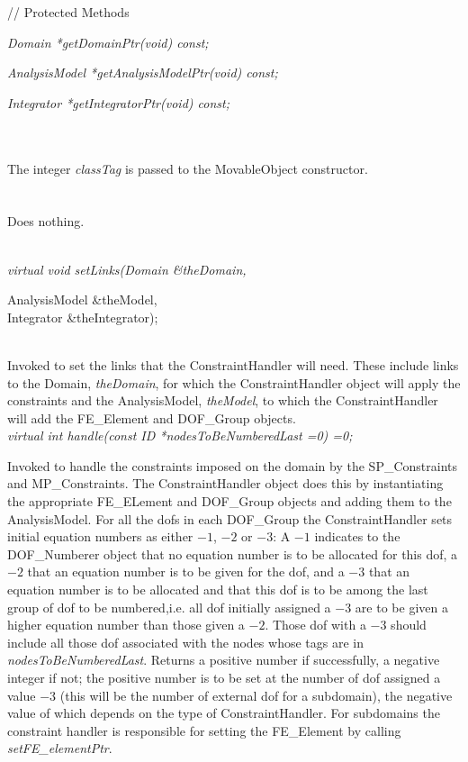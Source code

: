 // Protected Methods  

{\em Domain *getDomainPtr(void) const;} 

{\em AnalysisModel *getAnalysisModelPtr(void) const;} 

{\em Integrator *getIntegratorPtr(void) const;} 



 \\
\\ 
The integer {\em classTag} is passed to the MovableObject constructor. \\

 \\
\\ 
Does nothing. \\

\\
{\em virtual void setLinks(Domain \&theDomain, 

\indent\indent\indent\indent\indent AnalysisModel \&theModel, \\
\indent\indent\indent\indent\indent Integrator \&theIntegrator);} \\
Invoked to set the links that the ConstraintHandler will need. These
include links to the Domain, {\em theDomain}, for which the
ConstraintHandler object will apply the constraints and the
AnalysisModel, {\em theModel}, to which the ConstraintHandler will add
the FE\_Element and DOF\_Group objects. \\

{\em virtual int handle(const ID *nodesToBeNumberedLast =0) =0;} 

Invoked to handle the constraints imposed on the domain by the
SP\_Constraints and MP\_Constraints. The ConstraintHandler object does
this by instantiating the appropriate FE\_ELement and DOF\_Group objects 
and adding them to the AnalysisModel. For all the dofs in each
DOF\_Group the ConstraintHandler sets initial equation numbers as
either $-1$, $-2$ or $-3$: A $-1$ indicates to the DOF\_Numberer object
that no equation number is to be allocated for this dof, a $-2$ that
an equation number is to be given for the dof, and a $-3$ that an
equation number is to be allocated and that this dof is to
be among the last group of dof to be numbered,i.e. all dof initially
assigned a $-3$ are to be given a higher equation number than those
given a $-2$. Those dof with a $-3$ should include all those dof
associated with the nodes whose tags are in {\em
nodesToBeNumberedLast}. Returns a positive number if successfully, a
negative integer if not; the positive number is to be set at the
number of dof assigned a value $-3$ (this will be the number of
external dof for a subdomain), the negative value of which depends on
the type of ConstraintHandler. For subdomains the constraint handler
is responsible for setting the FE\_Element by calling {\em
setFE\_elementPtr}. \\    

